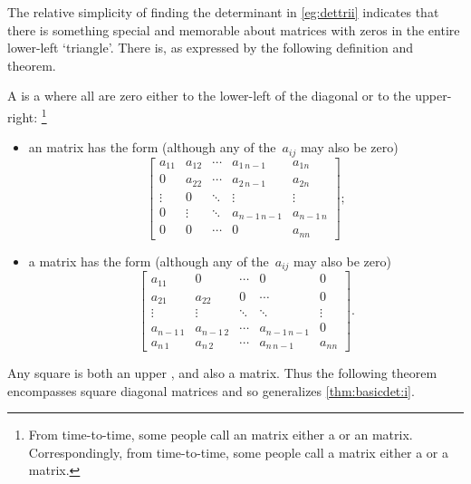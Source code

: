 The relative simplicity of finding the determinant in \cref{eg:dettrii} indicates that there is something special and memorable about matrices with zeros in the entire lower-left `triangle'.
There is, as expressed by the following definition and theorem.






\begin{definition} \label{def:trim}
A  is a  where all  are zero either to the lower-left of the diagonal or to the upper-right:%
\footnote{From time-to-time, some people call an  matrix either a  or an  matrix.  
Correspondingly, from time-to-time, some people  call a  matrix either a  or a  matrix.}
\begin{itemize}
\item an  matrix has the form (although any of the~\(a_{ij}\) may also be zero)
\begin{equation*}
\begin{bmatrix} a_{11}&a_{12}&\cdots&a_{1\,n-1}&a_{1n}
\\0&a_{22}&\cdots&a_{2\,n-1} &a_{2n}
\\\vdots&0&\ddots&\vdots&\vdots
\\0&\vdots&\ddots&a_{n-1\,n-1}&a_{n-1\,n} 
\\0&0&\cdots&0&a_{nn} \end{bmatrix};
\end{equation*}

\item a  matrix has the form (although any of the~\(a_{ij}\) may also be zero)
\begin{equation*}
\begin{bmatrix} a_{11}&0&\cdots&0&0
\\a_{21}&a_{22}&0&\cdots &0
\\\vdots&\vdots&\ddots&\ddots&\vdots
\\a_{n-1\,1}&a_{n-1\,2}&\cdots&a_{n-1\,n-1}&0 
\\a_{n\,1}&a_{n\,2}&\cdots&a_{n\,n-1}&a_{nn} \end{bmatrix}.
\end{equation*}
\end{itemize}
\end{definition}


Any square  is both an upper , and also a  matrix.
Thus the following theorem encompasses square diagonal matrices and so generalizes \cref{thm:basicdet:i}.



